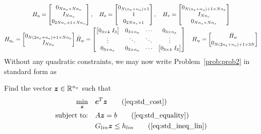\documentclass[10pt]{article}
\begin{document}
\begin{gather*}
H_u = \begin{bmatrix}
0_{N n_x \times N n_u} \\ I_{N n_u} \\ 0_{2 N n_x + 1 \times N n_u}
\end{bmatrix}, \quad H_s = \begin{bmatrix}
0_{N(n_x+n_u) \times 1} \\ 1 \\ 0_{2N n_x \times 1}
\end{bmatrix}, \quad H_v = \begin{bmatrix}
0_{N (n_x+n_u) + 1 \times N n_x} \\ I_{N n_x} \\ 0_{N n_x \times N n_x} 
\end{bmatrix}  \\
H_{\eta_v} = \begin{bmatrix}
0_{N(2n_x+n_u)+1 \times N n_x} \\ I_{N n_x}
\end{bmatrix}
\bar{H}_w = \begin{bmatrix}
\big[ 0_{3 \times 4} \ I_{3} \big] & 0_{3 \times n_x} & \cdots & 0_{3 \times n_x} \\
\vdots & \ddots & \ddots & \vdots \\
0_{3 \times n_x} & 0_{3 \times n_x} & \cdots & \big[ 0_{3 \times 4} \ I_{3} \big]
\end{bmatrix} \quad H_w = \begin{bmatrix}
\bar{H}_w \\ 0_{N (2n_x+n_u)+1 \times 3N} 
\end{bmatrix}
\end{gather*}
Without any quadratic constraints, we may now write Problem~\ref{prob:prob2} in standard form as
\begin{problem}
Find the vector $\bm{z}\in{\mathbb{R}}^{n_z}$ such that
\begin{subequations}\label{eq:prob2}
\begin{align}
\min_{\bm{z}} &\quad \bm{c}^T \bm{z} \tag{\ref{eq:std_cost}}\\
\text{subject to:} &\quad A \bm{z} = b \tag{\ref{eq:std_equality}} \\
&\quad G_{lin} \bm{z} \leq h_{lin} \tag{\ref{eq:std_ineq_lin}}
\end{align}
\end{subequations}
\end{problem}
\end{document}
